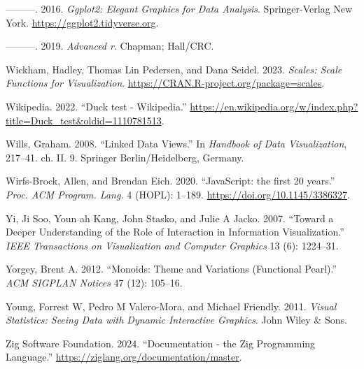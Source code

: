 \documentclass[
]{book}
\newlength{\cslhangindent}
\newenvironment{CSLReferences}[2] %
 {\begin{list}{}{%
  \setlength{\itemindent}{0pt}
  \setlength{\leftmargin}{0pt}
  \setlength{\parsep}{0pt}
  \ifodd #1
   \setlength{\leftmargin}{\cslhangindent}
   \setlength{\itemindent}{-1\cslhangindent}
  \fi
  \setlength{\itemsep}{#2\baselineskip}}}
 {\end{list}}
\theoremstyle{definition}
\theoremstyle{definition}
\theoremstyle{definition}
\theoremstyle{definition}
\theoremstyle{remark}
\begin{document}
\begin{CSLReferences}{1}{0}
---------. 2016. \emph{Ggplot2: Elegant Graphics for Data Analysis}. Springer-Verlag New York. \url{https://ggplot2.tidyverse.org}.

---------. 2019. \emph{Advanced r}. Chapman; Hall/CRC.

Wickham, Hadley, Thomas Lin Pedersen, and Dana Seidel. 2023. \emph{Scales: Scale Functions for Visualization}. \url{https://CRAN.R-project.org/package=scales}.

Wikipedia. 2022. {``{Duck test - Wikipedia}.''} \url{https://en.wikipedia.org/w/index.php?title=Duck_test&oldid=1110781513}.

Wills, Graham. 2008. {``Linked Data Views.''} In \emph{Handbook of Data Visualization}, 217--41. ch. II. 9. Springer Berlin/Heidelberg, Germany.

Wirfs-Brock, Allen, and Brendan Eich. 2020. {``{JavaScript: the first 20 years}.''} \emph{Proc. ACM Program. Lang.} 4 (HOPL): 1--189. \url{https://doi.org/10.1145/3386327}.

Yi, Ji Soo, Youn ah Kang, John Stasko, and Julie A Jacko. 2007. {``Toward a Deeper Understanding of the Role of Interaction in Information Visualization.''} \emph{IEEE Transactions on Visualization and Computer Graphics} 13 (6): 1224--31.

Yorgey, Brent A. 2012. {``Monoids: Theme and Variations (Functional Pearl).''} \emph{ACM SIGPLAN Notices} 47 (12): 105--16.

Young, Forrest W, Pedro M Valero-Mora, and Michael Friendly. 2011. \emph{Visual Statistics: Seeing Data with Dynamic Interactive Graphics}. John Wiley \& Sons.

Zig Software Foundation. 2024. {``Documentation - the Zig Programming Language.''} \url{https://ziglang.org/documentation/master}.

\end{CSLReferences}
\end{document}
